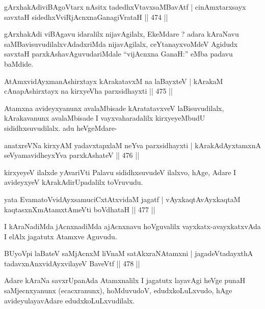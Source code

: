\begin{shl}
gArxhakAdiviBAgoV\s tarx nAsitx tadedhxVtavxsaMBavAtf |
cinAmxtarxsayx savxtaH sidedhxVviRjAcnxnaGanagiVrataH \hfill  || 474 ||
\end{shl}

\begin{artha}
gArxhakAdi viBAgavu idaralilx nijavAgilalx, EkeMdare ? adara kAraNavu saMBavisu\-vudilalxvAdadxriMda nijavAgilalx, ceYtanayxvoMdeV Agidudx savxtaH parxkAshavAguvuda\-riMdale ``vijAcnxna GanaH:'' eMba padavu baMdide.
\end{artha}

\begin{shl}
AtAmxvidAyxmanAshirxtayx kArakatavxM na laBayxteV |
kArakaM cAnapAshirxtayx na kirxyeVha parxsidhayxti \hfill  || 475 ||
\end{shl}

\begin{artha}
Atamxna avideyxyanunx avalaMbisade kAratatavxveV laBisuvudilalx,
kArakavanunx avalaMbisade I vayxvaharadalilx kirxyeyeMbudU
sididhxsuvudilalx. adu heVgeMdare-
\end{artha}

\begin{shl}
anatxreVNa kirxyAM yadavxtapxlaM neYva parxsidhayxti |
kArakAdAyxtamxnA seVyamavidheyxYva parxkAshateV \hfill  || 476 ||
\end{shl}

\begin{artha}
kirxyeyeV ilalxde yAvariVti Palavu sididhxsuvudeV ilalxvo, hAge, Adare I avideyxyeV kArakAdirUpadalilx toVruvudu.
\end{artha}

\begin{shl}
yata EvamatoV\s vidAyxsamuciCxtAtxvidaM jagatf |
vAyxkaqtAvAyxkaqtaM kaqtasxnXmAtamxtAmeVti boVdhataH \hfill  || 477 ||
\end{shl}

\begin{artha}
I kAraNadiMda jAcnxnadiMda ajAcnxnavu hoVguvalilx vayxkatx-avayxkatxvAda I elAlx jagatutx Atamxve Aguvudu.
\end{artha}

\begin{shl}
BUyoV\s pi laBateV saMjAcnxM liVnaM satAkxraNAtamxni |
jagadeVtadayxthA tadavxnAnxvidAyxvilayeV BaveVtf \hfill  || 478 ||
\end{shl}

\begin{artha}
Adare kAraNa savxrUpanAda Atamxnalilx I jagatutx layavAgi heVge punaH saMjecnx\-yanunx (ecacxranunx), hoMduvudoV, edudxkoLuLxvudo, hAge avideyulaya\-vAdare edudxkoLuLxvudilalx.
\end{artha}

